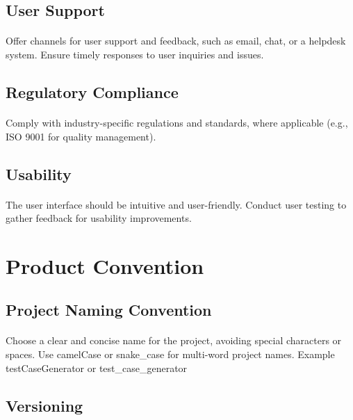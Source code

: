 \documentclass{article}
\begin{document}
\subsection{User Support}
\paragraph{}
Offer channels for user support and feedback, such as email, chat, or a helpdesk system.
Ensure timely responses to user inquiries and issues.

\subsection{Regulatory Compliance}
\paragraph{}
Comply with industry-specific regulations and standards, where applicable (e.g., ISO 9001 for quality management).

\subsection{Usability}
\paragraph{}
The user interface should be intuitive and user-friendly.
Conduct user testing to gather feedback for usability improvements.


\section{Product Convention}
\subsection{Project Naming Convention}
\paragraph{}
Choose a clear and concise name for the project, avoiding special characters or spaces.
Use camelCase or snake\_case for multi-word project names.
Example\: testCaseGenerator or test\_case\_generator

\subsection{Versioning}
\end{document}
